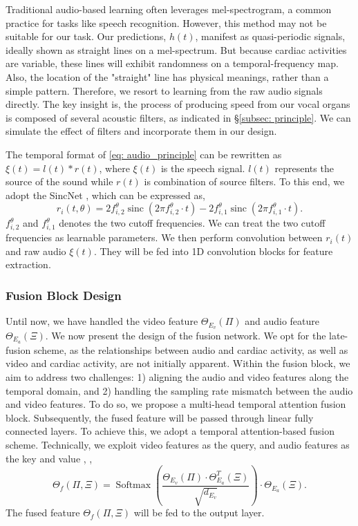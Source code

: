   Traditional audio-based learning often leverages mel-spectrogram, a common practice for tasks like speech recognition. However, this method may not be suitable for our task. Our predictions, $h(t)$, manifest as quasi-periodic signals, ideally shown as straight lines on a mel-spectrum. But because cardiac activities are variable, these lines will exhibit randomness on a temporal-frequency map. Also, the location of the "straight" line has physical meanings, rather than a simple pattern. Therefore, we resort to learning from the raw audio signals directly.  
The key insight is, the process of producing speed from our vocal organs is composed of several acoustic filters, as indicated in \S\ref{subsec: principle}.  We can simulate the effect of filters and incorporate them in our design. 

The temporal format of \eqn\eqref{eq: audio_principle} can be rewritten as $\xi(t) = l(t) \ast r(t)$,
where $\xi(t)$ is the speech signal. $l(t)$ represents the source of the sound while $r(t)$ is combination of source filters.  To this end, we adopt the SincNet  \cite{ravanelli2018speaker}, which can be expressed as,
\begin{equation}
    r_i(t, \theta) = 2 f_{i,2}^{\theta} \operatorname{sinc} (2 \pi f_{i,2}^{\theta} \cdot t) - 2 f_{i,1}^{\theta} \operatorname{sinc} (2 \pi f_{i,1}^{\theta} \cdot t).
\end{equation}
$f_{i,2}^{\theta}$ and $f_{i,1}^{\theta}$ denotes the two cutoff frequencies. We can treat the two cutoff frequencies as learnable parameters. 
We then perform convolution between $r_i(t)$ and raw audio $\xi(t)$. 
They will be fed into 1D convolution blocks for feature extraction.

\subsubsection{Fusion Block Design}
Until now, we have handled the video feature $\Theta_{E_v}(\Pi)$ and audio feature $\Theta_{E_a}(\Xi)$. We now present the design of the fusion network. We opt for the late-fusion scheme, as the relationships between audio and cardiac activity, as well as video and cardiac activity, are not initially apparent. Within the fusion block, we aim to address two challenges: 1) aligning the audio and video features along the temporal domain, and 2) handling the sampling rate mismatch between the audio and video features. To do so, we propose a multi-head temporal attention fusion block. Subsequently, the fused feature will be passed through linear fully connected layers. 
To achieve this, we adopt a temporal attention-based fusion scheme. Technically, we exploit video features as the query, and audio features as the key and value
, \ie,
\begin{equation}
    \Theta_{f}(\Pi, \Xi) = \operatorname{Softmax}\left(\frac{\Theta_{E_v}(\Pi) \cdot \Theta^T_{E_a}(\Xi)}{\sqrt{d_{E_v}}} \right) \cdot \Theta_{E_a}(\Xi).
\end{equation}
The fused feature $\Theta_f(\Pi, \Xi)$ will be fed to the output layer.

